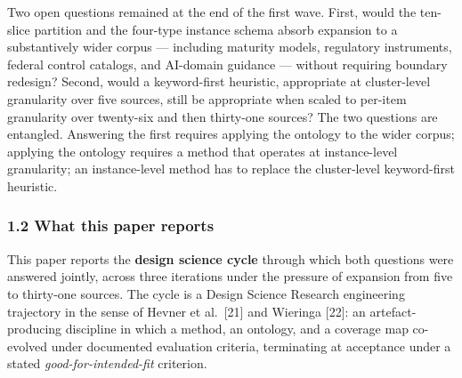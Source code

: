\documentclass[
]{article}
\begin{document}
Two open questions remained at the end of the first wave. First, would
the ten-slice partition and the four-type instance schema absorb
expansion to a substantively wider corpus --- including maturity models,
regulatory instruments, federal control catalogs, and AI-domain guidance
--- without requiring boundary redesign? Second, would a keyword-first
heuristic, appropriate at cluster-level granularity over five sources,
still be appropriate when scaled to per-item granularity over twenty-six
and then thirty-one sources? The two questions are entangled. Answering
the first requires applying the ontology to the wider corpus; applying
the ontology requires a method that operates at instance-level
granularity; an instance-level method has to replace the cluster-level
keyword-first heuristic.

\subsubsection{1.2 What this paper
reports}\label{what-this-paper-reports}

This paper reports the \textbf{design science cycle} through which both
questions were answered jointly, across three iterations under the
pressure of expansion from five to thirty-one sources. The cycle is a
Design Science Research engineering trajectory in the sense of Hevner et
al.~{[}21{]} and Wieringa {[}22{]}: an artefact-producing discipline in
which a method, an ontology, and a coverage map co-evolved under
documented evaluation criteria, terminating at acceptance under a stated
\emph{good-for-intended-fit} criterion.
\end{document}
